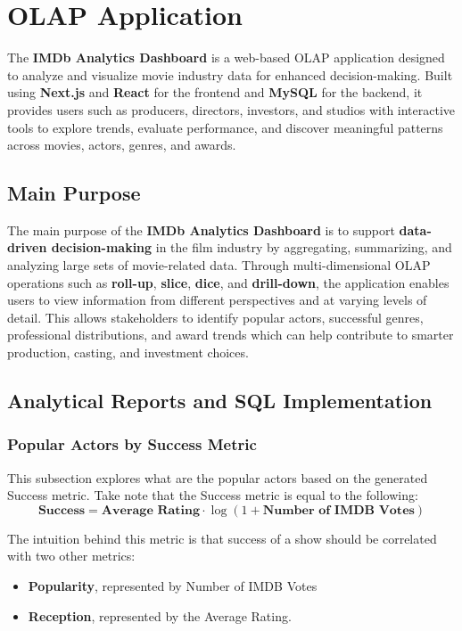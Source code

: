 \section{OLAP Application} \label{olap}

The \textbf{IMDb Analytics Dashboard} is a web-based OLAP application designed to analyze and visualize movie industry data for enhanced decision-making. Built using \textbf{Next.js} and \textbf{React} for the frontend and \textbf{MySQL} for the backend, it provides users such as producers, directors, investors, and studios with interactive tools to explore trends, evaluate performance, and discover meaningful patterns across movies, actors, genres, and awards.

\subsection{Main Purpose}

The main purpose of the \textbf{IMDb Analytics Dashboard} is to support \textbf{data-driven decision-making} in the film industry by aggregating, summarizing, and analyzing large sets of movie-related data. Through multi-dimensional OLAP operations such as \textbf{roll-up}, \textbf{slice}, \textbf{dice}, and \textbf{drill-down}, the application enables users to view information from different perspectives and at varying levels of detail. This allows stakeholders to identify popular actors, successful genres, professional distributions, and award trends which can help contribute to smarter production, casting, and investment choices.


\subsection{Analytical Reports and SQL Implementation}

\subsubsection{Popular Actors by Success Metric}

This subsection explores what are the popular actors based on the generated Success metric. Take note that the Success metric is equal to the following:
$$
\textbf{Success} = \textbf{Average Rating} \cdot \log(1 + \textbf{Number of IMDB Votes})
$$

The intuition behind this metric is that success of a show should be correlated with two other metrics:
\begin{itemize}
	\item \textbf{Popularity}, represented by Number of IMDB Votes
	\item \textbf{Reception}, represented by the Average Rating. 
\end{itemize}

